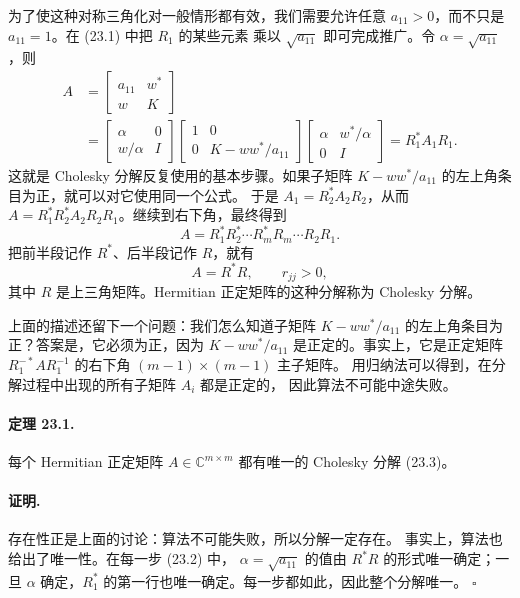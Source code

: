 \documentclass[UTF8,fontset=none,12pt]{ctexart}
\begin{document}
为了使这种对称三角化对一般情形都有效，我们需要允许任意
$a_{11}>0$，而不只是 $a_{11}=1$。在 (23.1) 中把 $R_1$ 的某些元素
乘以 $\sqrt{a_{11}}$ 即可完成推广。令
$\alpha=\sqrt{a_{11}}$，则
\[
\begin{aligned}
A&=
\begin{bmatrix}
a_{11}&w^*\\
w&K
\end{bmatrix}\\
&=
\begin{bmatrix}
\alpha&0\\
w/\alpha&I
\end{bmatrix}
\begin{bmatrix}
1&0\\
0&K-ww^*/a_{11}
\end{bmatrix}
\begin{bmatrix}
\alpha&w^*/\alpha\\
0&I
\end{bmatrix}
=R_1^*A_1R_1.
\end{aligned}
\]
这就是 Cholesky 分解反复使用的基本步骤。如果子矩阵
$K-ww^*/a_{11}$ 的左上角条目为正，就可以对它使用同一个公式。
于是 $A_1=R_2^*A_2R_2$，从而
$A=R_1^*R_2^*A_2R_2R_1$。继续到右下角，最终得到
\begin{equation}
A=R_1^*R_2^*\cdots R_m^*R_m\cdots R_2R_1.
\tag{23.2}
\end{equation}
把前半段记作 $R^*$、后半段记作 $R$，就有
\begin{equation}
A=R^*R,\qquad r_{jj}>0,
\tag{23.3}
\end{equation}
其中 $R$ 是上三角矩阵。Hermitian 正定矩阵的这种分解称为
Cholesky 分解。

上面的描述还留下一个问题：我们怎么知道子矩阵
$K-ww^*/a_{11}$ 的左上角条目为正？答案是，它必须为正，因为
$K-ww^*/a_{11}$ 是正定的。事实上，它是正定矩阵
$R_1^{-*}AR_1^{-1}$ 的右下角 $(m-1)\times(m-1)$ 主子矩阵。
用归纳法可以得到，在分解过程中出现的所有子矩阵 $A_i$ 都是正定的，
因此算法不可能中途失败。

\paragraph{定理 23.1.}
每个 Hermitian 正定矩阵 $A\in\mathbb{C}^{m\times m}$ 都有唯一的
Cholesky 分解 (23.3)。

\paragraph{证明.}
存在性正是上面的讨论：算法不可能失败，所以分解一定存在。
事实上，算法也给出了唯一性。在每一步 (23.2) 中，
$\alpha=\sqrt{a_{11}}$ 的值由 $R^*R$ 的形式唯一确定；一旦 $\alpha$
确定，$R_1^*$ 的第一行也唯一确定。每一步都如此，因此整个分解唯一。
\hfill$\square$
\end{document}
